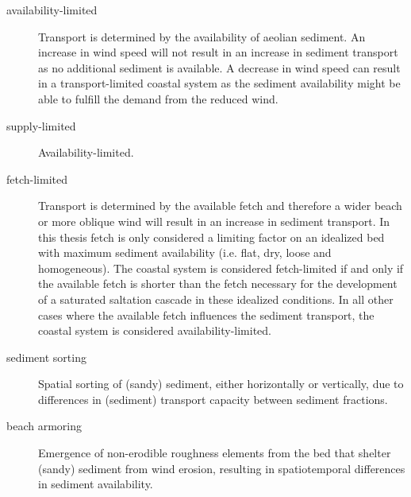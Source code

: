 \begin{description}
\item[availability-limited] Transport is determined by the
  availability of aeolian sediment. An increase in wind speed will not
  result in an increase in sediment transport as no additional
  sediment is available. A decrease in wind speed can result in a
  transport-limited coastal system as the sediment availability might
  be able to fulfill the demand from the reduced wind.
\item[supply-limited] Availability-limited.
\item[fetch-limited] Transport is determined by the available fetch
  and therefore a wider beach or more oblique wind will result in an
  increase in sediment transport. In this thesis fetch is only
  considered a limiting factor on an idealized bed with maximum
  sediment availability (i.e. flat, dry, loose and homogeneous). The
  coastal system is considered fetch-limited if and only if the
  available fetch is shorter than the fetch necessary for the
  development of a saturated saltation cascade in these idealized
  conditions. In all other cases where the available fetch influences
  the sediment transport, the coastal system is considered
  availability-limited.
\item[sediment sorting] Spatial sorting of (sandy) sediment, either
  horizontally or vertically, due to differences in (sediment)
  transport capacity between sediment fractions.
\item[beach armoring] Emergence of non-erodible roughness elements
  from the bed that shelter (sandy) sediment from wind erosion,
  resulting in spatiotemporal differences in sediment availability.
\end{description}

